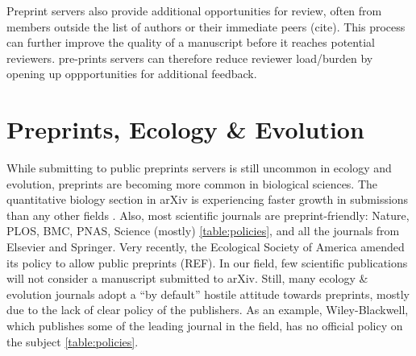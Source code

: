 \documentclass[letterpaper,twocolumn,superscriptaddress,showkeys]{revtex4}
\begin{document}
Preprint servers also provide additional opportunities for review, often from members outside the list of authors or their immediate peers (cite). This process can further improve the quality of a manuscript before it reaches potential reviewers. pre-prints servers can therefore reduce reviewer load/burden by opening up oppportunities for additional feedback.
 



\section{Preprints, Ecology \& Evolution}

While submitting to public preprints servers is still uncommon in ecology and
evolution, preprints are becoming more common in biological sciences. The
quantitative biology section in arXiv is experiencing faster growth in
submissions than any other fields \cite{cal12}. Also, most scientific journals
are preprint-friendly: Nature, PLOS, BMC, PNAS, Science (mostly)
\ref{table:policies}, and all the journals from Elsevier and Springer. Very
recently, the Ecological Society of America amended its policy to allow
public preprints (REF). In our field, few scientific publications will not
consider a manuscript submitted to arXiv.  Still, many ecology \& evolution
journals adopt a ``by default'' hostile attitude towards preprints, mostly due
to the lack of clear policy of the publishers. As an example, Wiley-Blackwell,
which publishes some of the leading journal in the field, has no official policy
on the subject \ref{table:policies}.
\end{document}
